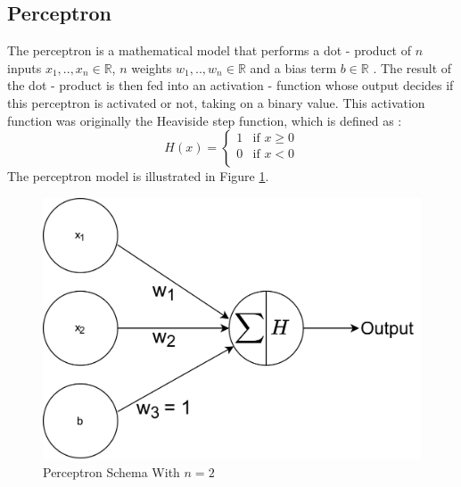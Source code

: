 \subsection{Perceptron}
The perceptron is a mathematical model that performs a dot - product of $n$ inputs $x_1, .., x_n \in \mathbb{R}$, $n$ weights $w_1, .., w_n \in \mathbb{R}$ and a bias term $b \in \mathbb{R}$ \cite{rosenblatt1958perceptron}. The result of the dot - product is then fed into an activation - function whose output decides if this perceptron is activated or not, taking on a binary value. This activation function was originally the Heaviside step function, which is defined as \cite{abramowitz1964handbook}:\\
\begin{equation}
        H(x) = \left\{
	\begin{array}{ll}
		\text{1} & \mbox{if } x \geq 0\\
		\text{0} & \mbox{if } x < 0 \\
	\end{array}
\right.
    \end{equation}
The perceptron model is illustrated in Figure \ref{fig:perceptron}.

\begin{figure}[ht]
    \centering
    \includegraphics[scale=0.12]{images/perceptron.jpg}
    \caption{Perceptron Schema With $n=2$}
    \label{fig:perceptron}
\end{figure}

